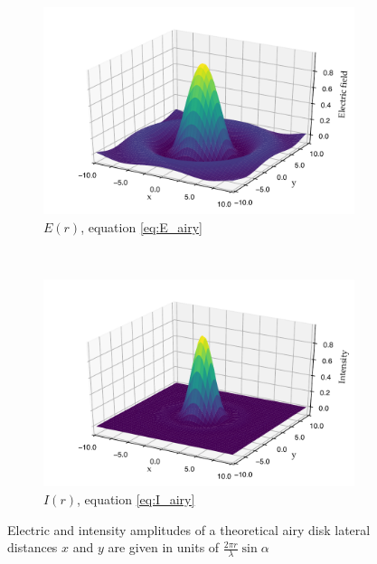 \begin{figure}
    \centering
    \begin{subfigure}[b]{\textwidth}
        \includegraphics{+airy_E_fill}
        \caption{\(E(r)\), equation \eqref{eq:E_airy}}
        \label{fig:airy_E_fill}
    \end{subfigure}
    ~
    \begin{subfigure}[b]{\textwidth}
        \includegraphics{+airy_I_fill}
        \caption{\(I(r)\), equation \eqref{eq:I_airy}}
        \label{fig:airy_I_fill}
    \end{subfigure}
    \caption{Electric and intensity amplitudes of a theoretical \gls{airy disk} lateral distances \(x\) and \(y\) are given in units of \(\frac{2\pi r }{\lambda}\sin {\alpha}\)}
    \label{fig:airy_disk}
\end{figure}

